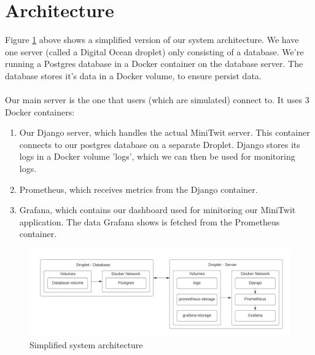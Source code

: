 \newpage
\section*{Architecture}

Figure \ref{fig:system-arch} above shows a simplified version of our system architecture. We have one server (called a Digital Ocean droplet) only consisting of a database. We're running a Postgres database in a Docker container on the database server. The database stores it's data in a Docker volume, to ensure persist data.
\\\\
Our main server is the one that users (which are simulated) connect to. It uses 3 Docker containers:

\begin{enumerate}
    \item Our Django server, which handles the actual MiniTwit server. This container connects to our postgres database on a separate Droplet. Django stores its logs in a Docker volume 'logs', which we can then be used for monitoring logs.
    
    \item Prometheus, which receives metrics from the Django container.

    \item Grafana, which contains our dashboard used for minitoring our MiniTwit application. The data Grafana shows is fetched from the Prometheus container.
\end{enumerate}

\begin{figure}
    \centering
    \includegraphics[width=\textwidth]{images/system-architechture.png}
    \caption{Simplified system architecture}
    \label{fig:system-arch}
\end{figure}